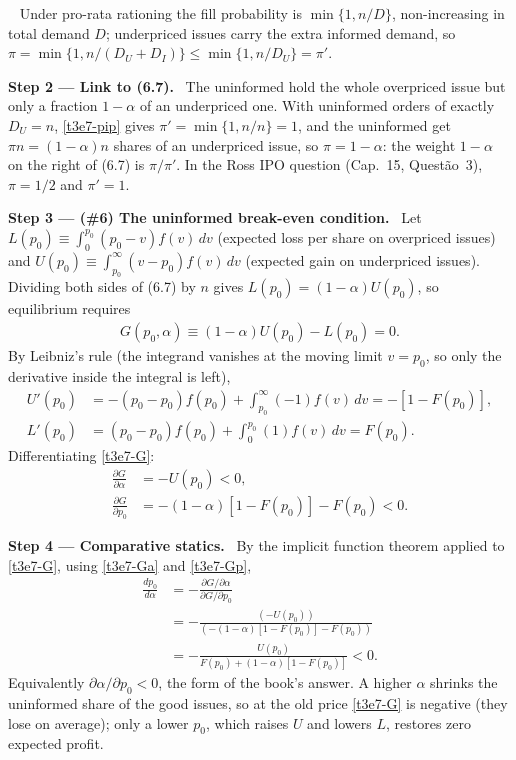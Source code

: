 \documentclass[11pt,a4paper]{article}
\newcommand{\step}[2]{\par\medskip\noindent\textbf{Step #1 --- #2.}~}
\newcommand{\answer}[1]{\par\smallskip\noindent\fbox{\textbf{Answer #1.}}~}
\begin{document}
\answer{(\#4)} Under pro-rata rationing the fill probability is $\min\{1,n/D\}$, non-increasing in total demand $D$; underpriced issues carry the extra informed demand, so $\pi=\min\{1,n/(D_U+D_I)\}\le\min\{1,n/D_U\}=\pi'$.

\step{2}{Link to (6.7)} The uninformed hold the whole overpriced issue but only a fraction $1-\alpha$ of an underpriced one. With uninformed orders of exactly $D_U=n$, \eqref{t3e7-pip} gives $\pi'=\min\{1,n/n\}=1$, and the uninformed get $\pi n=(1-\alpha)n$ shares of an underpriced issue, so $\pi=1-\alpha$: the weight $1-\alpha$ on the right of (6.7) is $\pi/\pi'$. In the Ross IPO question (Cap.~15, Quest\~ao~3), $\pi=1/2$ and $\pi'=1$.

\step{3}{(\#6) The uninformed break-even condition} Let $L(p_0)\equiv\int_0^{p_0}(p_0-v)f(v)\,dv$ (expected loss per share on overpriced issues) and $U(p_0)\equiv\int_{p_0}^{\infty}(v-p_0)f(v)\,dv$ (expected gain on underpriced issues). Dividing both sides of (6.7) by $n$ gives $L(p_0)=(1-\alpha)U(p_0)$, so equilibrium requires
\begin{align}
  G(p_0,\alpha) \equiv (1-\alpha)U(p_0) - L(p_0) = 0. \label{t3e7-G}
\end{align}
By Leibniz's rule (the integrand vanishes at the moving limit $v=p_0$, so only the derivative inside the integral is left),
\begin{align}
  U'(p_0) &= -(p_0-p_0)f(p_0)+\int_{p_0}^{\infty}(-1)f(v)\,dv = -[1-F(p_0)], \nonumber\\
  L'(p_0) &= (p_0-p_0)f(p_0)+\int_0^{p_0}(1)f(v)\,dv = F(p_0). \nonumber
\end{align}
Differentiating \eqref{t3e7-G}:
\begin{align}
  \frac{\partial G}{\partial\alpha} &= -U(p_0) < 0, \label{t3e7-Ga}\\
  \frac{\partial G}{\partial p_0} &= -(1-\alpha)[1-F(p_0)] - F(p_0) < 0. \label{t3e7-Gp}
\end{align}

\step{4}{Comparative statics} By the implicit function theorem applied to \eqref{t3e7-G}, using \eqref{t3e7-Ga} and \eqref{t3e7-Gp},
\begin{align}
  \frac{dp_0}{d\alpha} &= -\frac{\partial G/\partial\alpha}{\partial G/\partial p_0} \nonumber\\
   &= -\frac{(-U(p_0))}{(-(1-\alpha)[1-F(p_0)]-F(p_0))} \nonumber\\
   &= -\frac{U(p_0)}{F(p_0)+(1-\alpha)[1-F(p_0)]} < 0. \label{t3e7-dp}
\end{align}
Equivalently $\partial\alpha/\partial p_0<0$, the form of the book's answer. A higher $\alpha$ shrinks the uninformed share of the good issues, so at the old price \eqref{t3e7-G} is negative (they lose on average); only a lower $p_0$, which raises $U$ and lowers $L$, restores zero expected profit.
\end{document}
